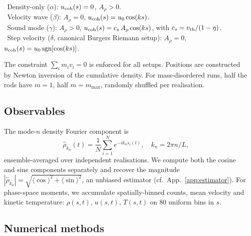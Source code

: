 \documentclass[aps,pre,twocolumn,superscriptaddress,longbibliography,floatfix]{revtex4-2}
\begin{document}
\noindent
\textbullet\ Density-only ($\alpha$): $u_{\rm coh}(s)=0$,
$A_\rho>0$.\\
\textbullet\ Velocity wave ($\beta$): $A_\rho=0$,
$u_{\rm coh}(s)=u_0\cos(ks)$.\\
\textbullet\ Sound mode ($\gamma$): $A_\rho>0$,
$u_{\rm coh}(s)=c_s\,A_\rho\cos(ks)$, with
$c_s=v_{\rm th}/(1-\eta)$.\\
\textbullet\ Step velocity ($\delta$, canonical Burgers Riemann
setup): $A_\rho=0$,
$u_{\rm coh}(s)=u_0\,\mathrm{sgn}[\cos(ks)]$.

The constraint $\sum_i m_i v_i=0$ is enforced for all setups.
Positions are constructed by Newton inversion of the cumulative
density. For mass-disordered runs, half the rods have $m=1$,
half $m=m_{\max}$, randomly shuffled per realisation.

\subsection{Observables}

The mode-$n$ density Fourier component is
\begin{equation}
\hat\rho_{k_n}(t) = \frac{1}{N}\sum_{i=1}^N
e^{-i k_n s_i(t)},
\quad k_n=2\pi n/L,
\end{equation}
ensemble-averaged over independent realisations. We compute
both the cosine and sine components separately and recover the
magnitude $|\hat\rho_{k_n}|=\sqrt{\langle\cos\rangle^2+
\langle\sin\rangle^2}$, an unbiased estimator (cf.\
App.~\ref{app:estimator}). For phase-space moments, we
accumulate spatially-binned counts, mean velocity and kinetic
temperature:
$\rho(s,t)$, $u(s,t)$, $T(s,t)$ on $80$ uniform bins in $s$.

\subsection{Numerical methods}
\end{document}
